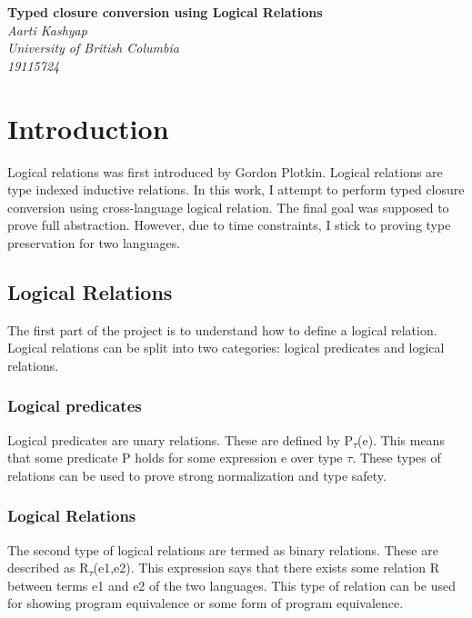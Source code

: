\documentclass[10pt]{article}
\begin{document}
\begin{titlepage}
	\begin{center}
		\Large\textbf{Typed closure conversion using Logical Relations}\\
		\bigbreak
		\large\textit{Aarti Kashyap} \\
		\large\textit{University of British Columbia}\\
			\large\textit{19115724}
		
	\end{center}
\end{titlepage}

\tableofcontents
\newpage

\section{Introduction} 
Logical relations was first introduced by Gordon Plotkin. Logical relations are type indexed inductive relations. In this work, I attempt to perform typed closure conversion using cross-language logical relation. The final goal was supposed to prove full abstraction. However, due to time constraints, I stick to proving type preservation for two languages. 


\subsection{Logical Relations}
The first part of the project is to understand how to define a logical relation. Logical relations can be split into two categories: logical predicates and logical relations.
\subsubsection{Logical predicates}
 Logical predicates are unary relations. These are defined by      P\textsubscript{$\tau$}(e). This means that some predicate P holds for some expression e over type $\tau$. These types of relations can be used to prove strong normalization and type safety.
 \subsubsection{Logical Relations}
 The second type of logical relations are termed as binary relations. These are described as R\textsubscript{$\tau$}(e1,e2). This expression says that there exists some relation R between terms e1 and e2 of the two languages. This type of relation can be used for showing program equivalence or some form of program equivalence. 
 
\end{document}
